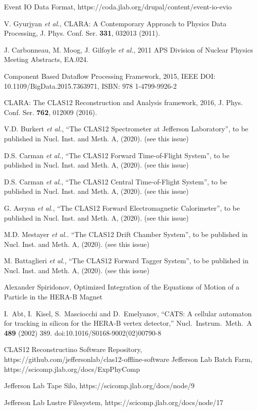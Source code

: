 \documentclass[3p,times,twocolumn]{elsarticle}
\begin{document}
\begin{thebibliography}{99}

Event IO Data Format,
https://coda.jlab.org/drupal/content/event-io-evio

V. Gyurjyan {\it et al.}, CLARA: A Contemporary Approach to Physics Data Processing, J. Phys. Conf. Ser.
{\bf 331}, 032013 (2011).

J. Carbonneau, M. Moog,  J. Gilfoyle {\it et al.}, 2011 APS Division of Nuclear Physics Meeting Abstracts, EA.024.

Component Based Dataflow Processing Framework, 2015, IEEE DOI: 10.1109/BigData.2015.7363971,
ISBN: 978 1-4799-9926-2

CLARA: The CLAS12 Reconstruction and Analysis framework, 2016, J. Phys. Conf. Ser. {\bf 762}, 012009 (2016).

V.D. Burkert {\it et al.}, ``The CLAS12 Spectrometer at Jefferson Laboratory'', to be published in Nucl.
Inst. and Meth. A, (2020). (see this issue)

D.S. Carman {\it et al.},   ``The CLAS12 Forward Time-of-Flight System'', to be published in Nucl.
Inst. and Meth. A, (2020). (see this issue)

D.S. Carman {\it et al.}, ``The CLAS12 Central Time-of-Flight System'', to be published in Nucl.
Inst. and Meth. A, (2020). (see this issue)

G. Asryan {\it et al.}, ``The CLAS12 Forward Electromagnetic Calorimeter'', to be published in Nucl.
Inst. and Meth. A, (2020). (see this issue)

M.D. Mestayer {\it et al.}. ``The CLAS12 Drift Chamber System'', to be published in Nucl. Inst. and
Meth. A, (2020). (see this issue)

M. Battaglieri {\it et al.}, ``The CLAS12 Forward Tagger System'', to be published in Nucl. Inst. and
Meth. A, (2020). (see this issue)

Alexander Spiridonov, Optimized Integration of the Equations of Motion of a Particle in the HERA-B Magnet

I.~Abt, I.~Kisel, S.~Masciocchi and D.~Emelyanov,
``CATS: A cellular automaton for tracking in silicon for the HERA-B vertex detector,''
Nucl.\ Instrum.\ Meth.\ A {\bf 489} (2002) 389.
doi:10.1016/S0168-9002(02)00790-8

{CLAS12 Reconstructino Software Repository},
https://github.com/jeffersonlab/clas12-offline-software
{Jefferson Lab Batch Farm},
https://scicomp.jlab.org/docs/ExpPhyComp

{Jefferson Lab Tape Silo},
https://scicomp.jlab.org/docs/node/9

{Jefferson Lab Lustre Filesystem},
https://scicomp.jlab.org/docs/node/17

\end{thebibliography}
\end{document}
